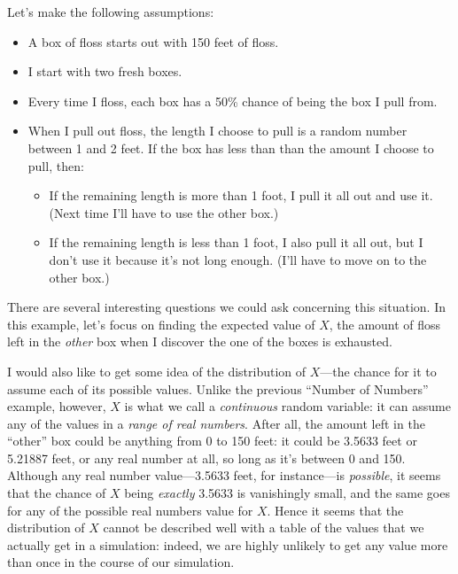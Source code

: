 \documentclass[]{book}
\providecommand{\tightlist}{%
  \setlength{\itemsep}{0pt}\setlength{\parskip}{0pt}}
\theoremstyle{definition}
\theoremstyle{definition}
\theoremstyle{remark}
\begin{document}
{Let's make the following assumptions:

\begin{itemize}
\tightlist
\item
  A box of floss starts out with 150 feet of floss.
\item
  I start with two fresh boxes.
\item
  Every time I floss, each box has a 50\% chance of being the box I pull
  from.
\item
  When I pull out floss, the length I choose to pull is a random number
  between 1 and 2 feet. If the box has less than than the amount I
  choose to pull, then:

  \begin{itemize}
  \tightlist
  \item
    If the remaining length is more than 1 foot, I pull it all out and
    use it. (Next time I'll have to use the other box.)
  \item
    If the remaining length is less than 1 foot, I also pull it all out,
    but I don't use it because it's not long enough. (I'll have to move
    on to the other box.)
  \end{itemize}
\end{itemize}

There are several interesting questions we could ask concerning this
situation. In this example, let's focus on finding the expected value of
\(X\), the amount of floss left in the \emph{other} box when I discover
the one of the boxes is exhausted.

I would also like to get some idea of the distribution of \(X\)---the
chance for it to assume each of its possible values. Unlike the previous
``Number of Numbers'' example, however, \(X\) is what we call a
\emph{continuous} random variable: it
can assume any of the values in a \emph{range of real numbers}. After
all, the amount left in the ``other'' box could be anything from 0 to
150 feet: it could be 3.5633 feet or 5.21887 feet, or any real number at
all, so long as it's between 0 and 150. Although any real number
value---3.5633 feet, for instance---is \emph{possible}, it seems that
the chance of \(X\) being \emph{exactly} 3.5633 is vanishingly small,
and the same goes for any of the possible real numbers value for \(X\).
Hence it seems that the distribution of \(X\) cannot be described well
with a table of the values that we actually get in a simulation: indeed,
we are highly unlikely to get any value more than once in the course of
our simulation.

}
\end{document}
